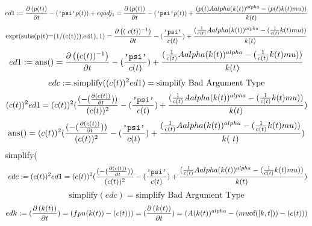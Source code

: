 \documentclass{article}
\begin{document}
\begin{equation} \label{eq:16}
ed1:=\frac{\partial \left(p(t)\right)}{\partial t}-(\mbox{\tt'psi'}\* p(t))+eqadj_1 = \frac{\partial \left(p(t)\right)}{\partial t}-(\mbox{\tt'psi'}\* p(t))+\frac{(p(t)\* A\* alpha\* (k(t))^{alpha}-(p(t)\* k(t)\* mu))}{k(t)}
\end{equation}
\begin{equation} \label{eq:17}
\mbox{expr}(\mbox{subs(p(t)=(1/(c(t))),ed1)},1) = \frac{\partial \left((~c(t))^{-1}\right)}{\partial t}-(\frac{\mbox{\tt'psi'}}{c(t)})+\frac{(\frac{1}{c(t)} \* A\* alpha\* (k(t))^{alpha}-(\frac{1}{c(t)} \* k(t)\* mu))}{k(t)}
\end{equation}
\begin{equation} \label{eq:18}
ed1:=\mbox{ans()} = \frac{\partial \left((c(t))^{-1}\right)}{\partial t}-(\frac{\mbox{\tt'psi'}}{c(t)})+\frac{(\frac{1}{c(t)} \* A\* alpha\* (k(t))^{alpha}-(\frac{1}{c(t)} \* k(t)\* mu))}{k(t)}
\end{equation}
\begin{equation} \label{eq:19}
edc:=\mbox{simplify}((c(t))^{2}\* ed1) = \mbox{simplify Bad Argument Type}
\end{equation}
\begin{equation} \label{eq:20}
(c(t))^{2}\* ed1 = (c(t))^{2}\* (\frac{(-(\frac{\partial \left(c(t)\right)}{\partial t}))}{(c(t))^{2}}-(\frac{\mbox{\tt'psi'}}{c(t)})+\frac{(\frac{1}{c(t)} \* A\* alpha\* (k(t))^{alpha}-(\frac{1}{c(t)} \* k(t)\* mu))}{k(t)})
\end{equation}
\begin{equation} \label{eq:21}
\mbox{ans()} = (c(t))^{2}\* (\frac{(-(\frac{\partial \left(c(t)\right)}{\partial t}))}{(c(t))^{2}}-(\frac{\mbox{\tt'psi'}}{c(t)})+\frac{(\frac{1}{c(t)} \* A\* alpha\* (k(t))^{alpha}-(\frac{1}{c(t)} \* k(t)\* mu))}{k(~t)})
\end{equation}
simplify(%
\begin{equation} \label{eq:23}
~edc:=(c(t))^{2}\* ed1 = (c(t))^{2}\* (\frac{(-(\frac{\partial \left(c(t)\right)}{\partial t}))}{(c(t))^{2}}-(\frac{\mbox{\tt'psi'}}{c(t)})+\frac{(\frac{1}{c(t)} \* A\* alpha\* (k(t))^{alpha}-(\frac{1}{c(t)} \* k(t)\* mu))}{k(t)})
\end{equation}
\begin{equation} \label{eq:24}
\mbox{simplify}(edc) = \mbox{simplify Bad Argument Type}
\end{equation}
\begin{equation} \label{eq:25}
edk:=(\frac{\partial \left(k(t)\right)}{\partial t})=(fpn(k(t))-(c(t))) = (\frac{\partial \left(k(t)\right)}{\partial t})=(A\* (k(t))^{alpha}-(mu\* \mbox{of}([k,t]))-(c(t)))
\end{equation}
\end{document}

